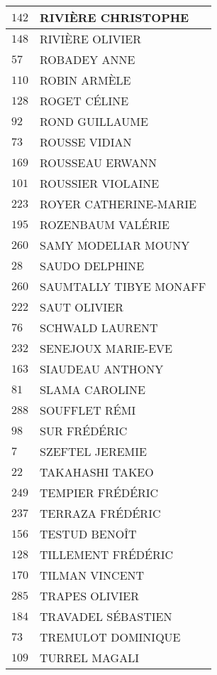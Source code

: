 \begin{xltabular}{\linewidth}{|l|X|}
    $142$ & RIVIÈRE CHRISTOPHE \\
    \hline
    $148$ & RIVIÈRE OLIVIER \\
    \hline
    $57$ & ROBADEY ANNE \\
    \hline
    $110$ & ROBIN ARMÈLE \\
    \hline
    $128$ & ROGET CÉLINE \\
    \hline
    $92$ & ROND GUILLAUME \\
    \hline
    $73$ & ROUSSE VIDIAN \\
    \hline
    $169$ & ROUSSEAU ERWANN \\
    \hline
    $101$ & ROUSSIER VIOLAINE \\
    \hline
    $223$ & ROYER CATHERINE-MARIE \\
    \hline
    $195$ & ROZENBAUM VALÉRIE \\
    \hline
    $260$ & SAMY MODELIAR MOUNY \\
    \hline
    $28$ & SAUDO DELPHINE \\
    \hline
    $260$ & SAUMTALLY TIBYE MONAFF \\
    \hline
    $222$ & SAUT OLIVIER \\
    \hline
    $76$ & SCHWALD LAURENT \\
    \hline
    $232$ & SENEJOUX MARIE-EVE \\
    \hline
    $163$ & SIAUDEAU ANTHONY \\
    \hline
    $81$ & SLAMA CAROLINE \\
    \hline
    $288$ & SOUFFLET RÉMI \\
    \hline
    $98$ & SUR FRÉDÉRIC \\
    \hline
    $7$ & SZEFTEL JEREMIE \\
    \hline
    $22$ & TAKAHASHI TAKEO \\
    \hline
    $249$ & TEMPIER FRÉDÉRIC \\
    \hline
    $237$ & TERRAZA FRÉDÉRIC \\
    \hline
    $156$ & TESTUD BENOÎT \\
    \hline
    $128$ & TILLEMENT FRÉDÉRIC \\
    \hline
    $170$ & TILMAN VINCENT \\
    \hline
    $285$ & TRAPES OLIVIER \\
    \hline
    $184$ & TRAVADEL SÉBASTIEN \\
    \hline
    $73$ & TREMULOT DOMINIQUE \\
    \hline
    $109$ & TURREL MAGALI \\

\end{xltabular}
